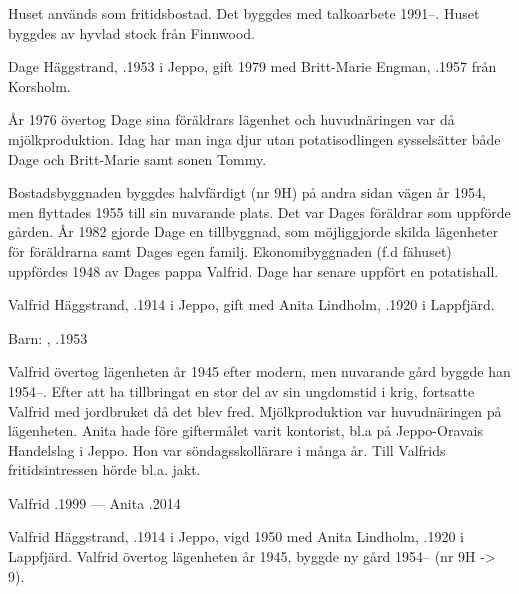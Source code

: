 Huset används som fritidsbostad. Det byggdes med talkoarbete 1991--. Huset byggdes av hyvlad stock från Finnwood.






Dage Häggstrand, .1953 i Jeppo, gift 1979 med Britt-Marie Engman, .1957 från Korsholm.
\begin{jhchildren}
  \item {}
  \item {}
\end{jhchildren}

År 1976 övertog Dage sina föräldrars lägenhet och huvudnäringen var då mjölkproduktion. Idag har man inga djur utan potatisodlingen sysselsätter både Dage och Britt-Marie samt sonen Tommy.

Bostadsbyggnaden byggdes halvfärdigt (nr 9H) på andra sidan vägen år 1954, men flyttades 1955 till sin nuvarande plats. Det var Dages föräldrar som uppförde gården. År 1982 gjorde Dage en tillbyggnad, som möjliggjorde skilda lägenheter för föräldrarna samt Dages egen familj. Ekonomibyggnaden (f.d fähuset) uppfördes 1948 av Dages pappa Valfrid. Dage har senare uppfört en potatishall.


Valfrid Häggstrand, .1914 i Jeppo, gift med Anita Lindholm, .1920 i Lappfjärd.

Barn: , .1953

Valfrid övertog lägenheten år 1945 efter modern, men nuvarande gård byggde han 1954--. Efter att ha tillbringat en stor del av sin ungdomstid i krig, fortsatte Valfrid med jordbruket då det blev fred. Mjölkproduktion var huvudnäringen på lägenheten. Anita hade före giftermålet varit kontorist, bl.a på Jeppo-Oravais Handelslag i Jeppo. Hon var söndagsskollärare i många år. Till Valfrids fritidsintressen hörde bl.a. jakt.

Valfrid .1999  ---  Anita .2014



Valfrid Häggstrand, .1914 i Jeppo, vigd 1950 med Anita Lindholm, .1920 i Lappfjärd. Valfrid övertog lägenheten år 1945, byggde ny gård 1954-- (nr 9H -> 9).\jhvspace{}


